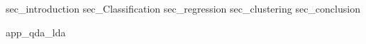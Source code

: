 \documentclass[12pt, a4paper]{article}
\begin{document}
\maketitle
\newpage
\tableofcontents
\newpage
\listoffigures
{sec_introduction}
{sec_Classification}
{sec_regression}
{sec_clustering}
{sec_conclusion}
\newpage


\appendix
{app_qda_lda}
\end{document}
